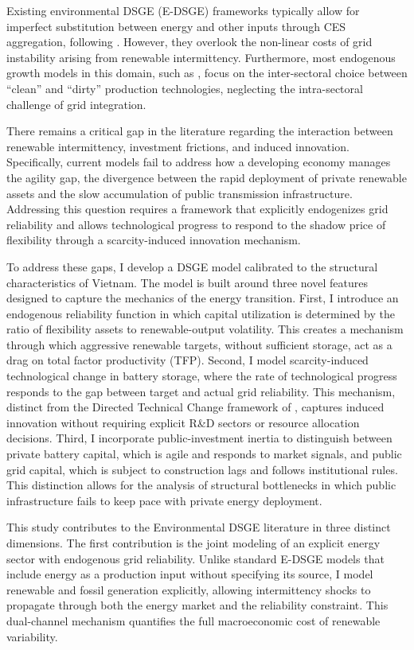\documentclass[12pt, a4paper]{article}
\begin{document}
	Existing environmental DSGE (E-DSGE) frameworks typically allow for imperfect substitution between energy and other inputs through CES aggregation, following \citet{heutel2012}. However, they overlook the non-linear costs of grid instability arising from renewable intermittency. Furthermore, most endogenous growth models in this domain, such as \citet{acemoglu2012environment}, focus on the inter-sectoral choice between ``clean'' and ``dirty'' production technologies, neglecting the intra-sectoral challenge of grid integration.
	
	There remains a critical gap in the literature regarding the interaction between renewable intermittency, investment frictions, and induced innovation. Specifically, current models fail to address how a developing economy manages the agility gap, the divergence between the rapid deployment of private renewable assets and the slow accumulation of public transmission infrastructure. Addressing this question requires a framework that explicitly endogenizes grid reliability and allows technological progress to respond to the shadow price of flexibility through a scarcity-induced innovation mechanism.
	
	To address these gaps, I develop a DSGE model calibrated to the structural characteristics of Vietnam. The model is built around three novel features designed to capture the mechanics of the energy transition. First, I introduce an endogenous reliability function in which capital utilization is determined by the ratio of flexibility assets to renewable-output volatility. This creates a mechanism through which aggressive renewable targets, without sufficient storage, act as a drag on total factor productivity (TFP). Second, I model scarcity-induced technological change in battery storage, where the rate of technological progress responds to the gap between target and actual grid reliability. This mechanism, distinct from the Directed Technical Change framework of \citet{acemoglu2002}, captures induced innovation without requiring explicit R\&D sectors or resource allocation decisions. Third, I incorporate public-investment inertia to distinguish between private battery capital, which is agile and responds to market signals, and public grid capital, which is subject to construction lags and follows institutional rules. This distinction allows for the analysis of structural bottlenecks in which public infrastructure fails to keep pace with private energy deployment.
	
	This study contributes to the Environmental DSGE literature in three distinct dimensions. The first contribution is the joint modeling of an explicit energy sector with endogenous grid reliability. Unlike standard E-DSGE models that include energy as a production input without specifying its source, I model renewable and fossil generation explicitly, allowing intermittency shocks to propagate through both the energy market and the reliability constraint. This dual-channel mechanism quantifies the full macroeconomic cost of renewable variability.
	
\end{document}
